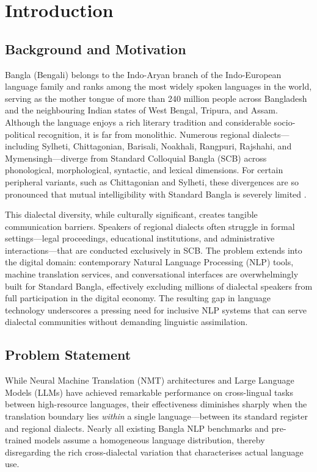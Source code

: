 \documentclass[12pt,a4paper]{article}
\begin{document}
\newpage
\tableofcontents
\newpage
\listoffigures
\newpage
\listoftables
\newpage

\section{Introduction}

\subsection{Background and Motivation}
Bangla (Bengali) belongs to the Indo-Aryan branch of the Indo-European language family and ranks among the most widely spoken languages in the world, serving as the mother tongue of more than 240 million people across Bangladesh and the neighbouring Indian states of West Bengal, Tripura, and Assam. Although the language enjoys a rich literary tradition and considerable socio-political recognition, it is far from monolithic. Numerous regional dialects---including Sylheti, Chittagonian, Barisali, Noakhali, Rangpuri, Rajshahi, and Mymensingh---diverge from Standard Colloquial Bangla (SCB) across phonological, morphological, syntactic, and lexical dimensions. For certain peripheral variants, such as Chittagonian and Sylheti, these divergences are so pronounced that mutual intelligibility with Standard Bangla is severely limited \cite{faria2025vashantor}.

This dialectal diversity, while culturally significant, creates tangible communication barriers. Speakers of regional dialects often struggle in formal settings---legal proceedings, educational institutions, and administrative interactions---that are conducted exclusively in SCB. The problem extends into the digital domain: contemporary Natural Language Processing (NLP) tools, machine translation services, and conversational interfaces are overwhelmingly built for Standard Bangla, effectively excluding millions of dialectal speakers from full participation in the digital economy. The resulting gap in language technology underscores a pressing need for inclusive NLP systems that can serve dialectal communities without demanding linguistic assimilation.

\subsection{Problem Statement}
While Neural Machine Translation (NMT) architectures and Large Language Models (LLMs) have achieved remarkable performance on cross-lingual tasks between high-resource languages, their effectiveness diminishes sharply when the translation boundary lies \textit{within} a single language---between its standard register and regional dialects. Nearly all existing Bangla NLP benchmarks and pre-trained models assume a homogeneous language distribution, thereby disregarding the rich cross-dialectal variation that characterises actual language use.
\end{document}
